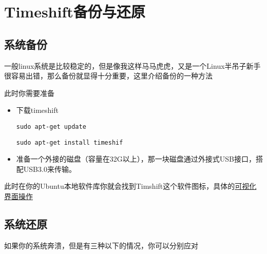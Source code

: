 \documentclass[
]{book}
\begin{document}
\hypertarget{timeshiftux5907ux4efdux4e0eux8fd8ux539f}{%
\section{Timeshift备份与还原}\label{timeshiftux5907ux4efdux4e0eux8fd8ux539f}}

\hypertarget{ux7cfbux7edfux5907ux4efd}{%
\subsection{系统备份}\label{ux7cfbux7edfux5907ux4efd}}

一般linux系统是比较稳定的，但是像我这样马马虎虎，又是一个Linux半吊子新手很容易出错，那么备份就显得十分重要，这里介绍备份的一种方法

此时你需要准备

\begin{itemize}
\item
  下载timeshift

  \texttt{sudo\ apt-get\ update}

  \texttt{sudo\ apt-get\ install\ timeshif}
\item
  准备一个外接的磁盘（容量在32G以上），那一块磁盘通过外接式USB接口，搭配USB3.0来传输。
\end{itemize}

此时在你的Ubuntu本地软件库你就会找到Timshift这个软件图标，具体的\href{https://www.linuxtechi.com/timeshift-backup-restore-ubuntu-linux/}{可视化界面操作}

\hypertarget{ux7cfbux7edfux8fd8ux539f}{%
\subsection{系统还原}\label{ux7cfbux7edfux8fd8ux539f}}

如果你的系统奔溃，但是有三种以下的情况，你可以分别应对
\end{document}
